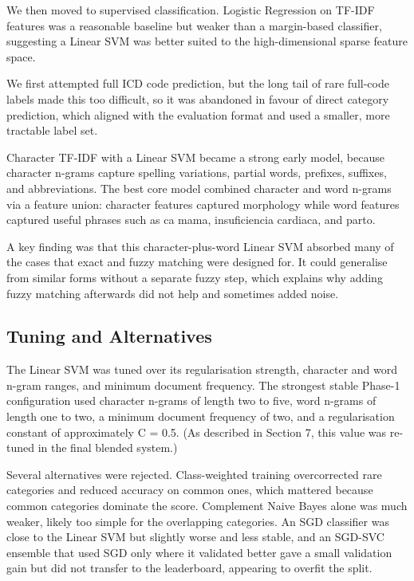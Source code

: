 \documentclass[9pt,a4paper,twoside]{utils/tau-class/tau}
\begin{document}
We then moved to supervised classification. Logistic Regression on TF-IDF features was a reasonable baseline but weaker than a margin-based classifier, suggesting a Linear SVM was better suited to the high-dimensional sparse feature space.

We first attempted full ICD code prediction, but the long tail of rare full-code labels made this too difficult, so it was abandoned in favour of direct category prediction, which aligned with the evaluation format and used a smaller, more tractable label set.

Character TF-IDF with a Linear SVM became a strong early model, because character n-grams capture spelling variations, partial words, prefixes, suffixes, and abbreviations. The best core model combined character and word n-grams via a feature union: character features captured morphology while word features captured useful phrases such as ca mama, insuficiencia cardiaca, and parto.

A key finding was that this character-plus-word Linear SVM absorbed many of the cases that exact and fuzzy matching were designed for. It could generalise from similar forms without a separate fuzzy step, which explains why adding fuzzy matching afterwards did not help and sometimes added noise.

\subsection{Tuning and Alternatives}

The Linear SVM was tuned over its regularisation strength, character and word n-gram ranges, and minimum document frequency. The strongest stable Phase-1 configuration used character n-grams of length two to five, word n-grams of length one to two, a minimum document frequency of two, and a regularisation constant of approximately C = 0.5. (As described in Section 7, this value was re-tuned in the final blended system.)

Several alternatives were rejected. Class-weighted training overcorrected rare categories and reduced accuracy on common ones, which mattered because common categories dominate the score. Complement Naive Bayes alone was much weaker, likely too simple for the overlapping categories. An SGD classifier was close to the Linear SVM but slightly worse and less stable, and an SGD-SVC ensemble that used SGD only where it validated better gave a small validation gain but did not transfer to the leaderboard, appearing to overfit the split.
\end{document}
